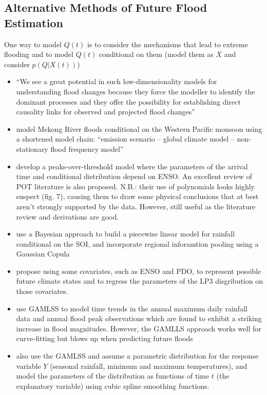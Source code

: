 \documentclass[11pt]{article}
\begin{document}
\subsection{Alternative Methods of Future Flood Estimation}

One way to model $Q(t)$ is to consider the mechanisms that lead to extreme flooding and to model $Q(t)$ conditional on them (model them as $X$ and consider $p(Q \big| X(t))$)
\begin{itemize}
  \item ``We see a great potential in such low-dimensionality models for understanding flood changes because they force the modeller to identify the dominant processes and they offer the possibility for establishing direct causality links for observed and projected flood changes'' \citep{Hall2014}
  \item \citet{Delgado2014} model Mekong River floods conditional on the Western Pacific monsoon using a shortened model chain: ``emission scenario – global climate model – non-stationary flood frequency model''
  \item \citet{Silva2016} develop a peaks-over-threshold model where the parameters of the arrival time and conditional distribution depend on ENSO. An excellent review of POT literature is also proposed. N.B.: their use of polynomials looks highly suspect (\ie fig. 7), causing them to draw some physical conclusions that at best aren't strongly supported by the data. However, still useful as the literature review and derivations are good.
  \item \citet{Sun2014} use a Bayesian approach to build a piecewise linear model for rainfall conditional on the SOI, and incorporate regional inforamtion pooling using a Gaussian Copula
  \item \citep{Griffis2007} propose using some covariates, such as ENSO and PDO, to represent possible future climate states and to regress the parameters of the LP3 disgribution on those covariates.
  \item \citet{Villarini2009} use GAMLSS to model time trends in the annual maximum daily rainfall data and annual flood peak observations which are found to exhibit a striking increase in flood magnitudes. However, the GAMLLS approach works well for curve-fitting but blows up when predicting future floods
  \item \citet{Villarini2010} also use the GAMLSS and assume a parametric distribution for the response variable $Y$ (seasonal rainfall, minimum and maximum temperatures), and model the parameters of the distribution as functions of time $t$ (the explanatory variable) using cubic spline smoothing functions.
\end{itemize}

\clearpage
\printbibliography
\end{document}
